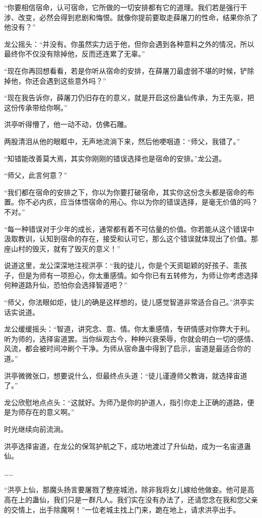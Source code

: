 \begin{this_body}
“你要相信宿命，认可宿命，它所做的一切安排都有它的道理。我们若是强行干涉、改变，必然会得到悲剧和悔恨。就像你提前要取走薛屠刀的性命，结果你杀了他没有？”

龙公摇头：“并没有。你虽然实力远于他，但你会遇到各种意料之外的情况，所以最终你不仅没有除掉他，反而还连累了无辜。”

“现在你再回想看看，若是你听从宿命的安排，在薛屠刀最虚弱不堪的时候，铲除掉他，你还会遇到这些意外吗？”

“现在我告诉你，薛屠刀仍旧存在的意义，就是开启这份蛊仙传承，为王先驱，把这份传承带给你啊。”

洪亭听得懵了，他一动不动，仿佛石雕。

两股清泪从他的眼眶中，无声地流淌下来，然后他哽咽道：“师父，我错了。”

“知错能改善莫大焉，其实你刚刚的错误选择也是宿命的安排。”龙公道。

“师父，此言何意？”

“我们都在宿命的安排之下，你以为你要打破宿命，其实你这份念头都是宿命的布置。你不必内疚，应当体悟宿命的用心。你以为你的错误选择，是毫无价值的吗？不对。”

“每一种错误对于少年的成长，通常都有着不可估量的价值。你若能从这个错误中汲取教训，认知到宿命的存在，接受和认可它，那么这个错误就体现出了价值。那座山村的毁灭，就有了毁灭的意义！”

说道这里，龙公深深地注视洪亭：“我的徒儿，你是个天资聪颖的好孩子、乖孩子，但是为师有一项担心，你太重感情。如今你已有五转修为，为师让你考虑选择何种道路升仙，恐怕你会选择智道吧？”

“师父，你法眼如炬，徒儿的确是这样想的，徒儿感觉智道非常适合自己。”洪亭实话实说道。

龙公缓缓摇头：“智道，讲究念、意、情。你太重感情，专研情感对你弊大于利。听为师的，选择宙道罢。当你纵观古今，种种兴衰荣辱，你就会明白一切的感情、风流，都会被时间冲刷个干净。为师从宿命蛊中得到了启示，宙道是最适合你的道。”

洪亭微微张口，想要说什么，但最终点头道：“徒儿谨遵师父教诲，就选择宙道了。”

龙公欣慰地点点头：“这就好。为师乃是你的护道人，指引你走上正确的道路，便是为师存在的意义啊。”

时光继续向前流淌。

洪亭选择宙道，在龙公的保驾护航之下，成功地渡过了升仙劫，成为一名宙道蛊仙。

……

“洪亭上仙，那魔头扬言要屠戮了整座城池，除非我将女儿嫁给他做妾。他可是高高在上的蛊仙，我们只是一群凡人。我们实在没有办法了，还请您念在我和您父亲的交情上，出手除魔啊！”一位老城主找上门来，跪在地上，请求洪亭出手。


\end{this_body}
